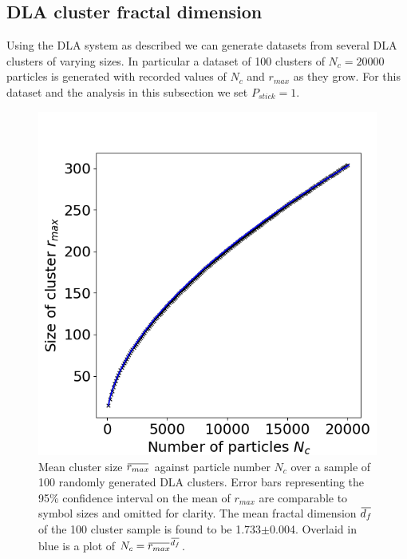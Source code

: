 \documentclass[10pt, twocolumn]{article} %
\newcommand{\overbar}[1]{\mkern 1.5mu\overline{\mkern-1.5mu#1\mkern-1.5mu}\mkern 1.5mu}
\begin{document}
\subsection*{DLA cluster fractal dimension}
  Using the DLA system as described we can generate datasets from several DLA clusters of varying sizes. In particular a dataset of 100 clusters of $N_c = 20000$ particles is generated with recorded values of $N_c$ and $r_{max}$ as they grow. For this dataset and the analysis in this subsection we set $P_{stick} = 1$.

\begin{figure}[t!]
\centering
\includegraphics[width=0.95\columnwidth]{100x20k_R.png}
  \caption{
    Mean cluster size $\overbar{r_{max}}$ against particle number $N_c$ over a sample of 100 randomly generated DLA clusters. Error bars representing the 95\% confidence interval on the mean of $r_{max}$ are comparable to symbol sizes and omitted for clarity. The mean fractal dimension $\overbar{d_f}$ of the 100 cluster sample is found to be 1.733$\pm$0.004. Overlaid in blue is a plot of $N_c={\overbar{r_{max}}}^{\overbar{d_f}}$.
  }
  \label{20k_R}
\end{figure}
\end{document}
